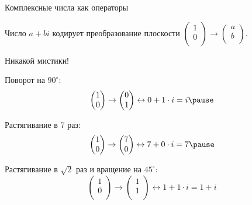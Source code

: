 \begin{frame}{Комплексные числа как операторы}
\begin{center}
\begin{tikzpicture}[
scale=1.8,
MyPoints/.style={draw=blue,fill=white,thick},
Segments/.style={draw=blue!50!red!70,thick},
MyCircles/.style={green!50!blue!50,thin}, 
every node/.style={scale=1}
]
\end{tikzpicture}

    \end{center}
        
\pause

Число $a+bi$ кодирует преобразование плоскости $\begin{pmatrix}
    1 \\
    0 \\
\end{pmatrix} \to \begin{pmatrix}
    a \\
    b \\
\end{pmatrix}$.

\end{frame}


\begin{frame}{Никакой мистики!}


Поворот на $90^{\circ}$:
\[
 \begin{pmatrix}
    1 \\
    0 \\
\end{pmatrix} \to \begin{pmatrix}
    0 \\
    1 \\
\end{pmatrix}   \leftrightarrow 0 + 1\cdot i = i \pause
\]

    Растягивание в 7 раз:
\[
 \begin{pmatrix}
    1 \\
    0 \\
\end{pmatrix} \to \begin{pmatrix}
    7 \\
    0 \\
\end{pmatrix}   \leftrightarrow 7 + 0\cdot i = 7 \pause
\]
       
    Растягивание в $\sqrt{2}$ раз и 
    вращение на $45^\circ$:
\[
 \begin{pmatrix}
    1 \\
    0 \\
\end{pmatrix} \to \begin{pmatrix}
    1 \\
    1 \\
\end{pmatrix}   \leftrightarrow 1 + 1\cdot i = 1 + i
\]
\end{frame}







